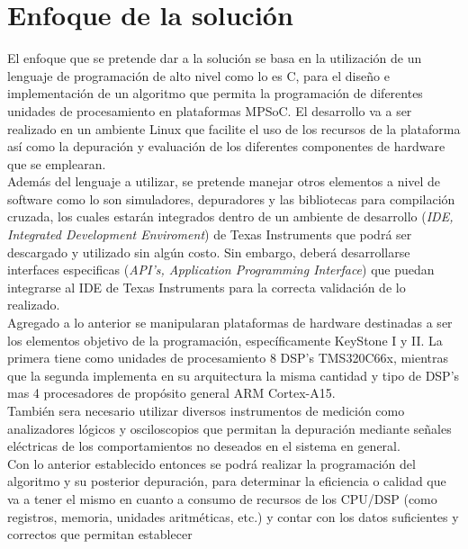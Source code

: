 

\chapter{Enfoque de la solución}
\label{ch:Enfoque_de_la_solucion}

El enfoque que se pretende dar a la solución se basa en la utilización de un lenguaje de programación
de alto nivel como lo es C, para el diseño e implementación de un algoritmo que permita la programación
de diferentes unidades de procesamiento en plataformas MPSoC. El desarrollo va a ser realizado en un ambiente
Linux que facilite el uso de los recursos de la plataforma así como la depuración y evaluación de los diferentes
componentes de hardware que se emplearan.\\

Además del lenguaje a utilizar, se pretende manejar otros elementos a nivel de software como lo son simuladores, 
depuradores y las bibliotecas para compilación cruzada, los cuales estarán integrados dentro de un ambiente de 
desarrollo (\textit{IDE, Integrated Development Enviroment}) de Texas Instruments que podrá ser descargado y 
utilizado sin algún costo. Sin embargo, deberá desarrollarse interfaces especificas 
(\textit{API's, Application Programming Interface}) que puedan integrarse al IDE de Texas Instruments para 
la correcta validación de lo realizado.\\

Agregado a lo anterior se manipularan plataformas de hardware destinadas a ser los elementos objetivo de la
programación, específicamente KeyStone I y II. La primera tiene como unidades de procesamiento 8 DSP's 
TMS320C66x, mientras que la segunda implementa en su arquitectura la misma cantidad y tipo de DSP's
mas 4 procesadores de propósito general ARM Cortex-A15.\\

También sera necesario utilizar diversos instrumentos de medición como analizadores lógicos y osciloscopios
que permitan la depuración mediante señales eléctricas de los comportamientos no deseados en el sistema en general.\\

Con lo anterior establecido entonces se podrá realizar la programación del algoritmo y su posterior depuración, para
determinar la eficiencia o calidad que va a tener el mismo en cuanto a consumo de recursos de los CPU/DSP (como registros,
memoria, unidades aritméticas, etc.) y contar con los datos suficientes y correctos que permitan establecer